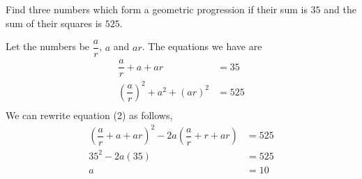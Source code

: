 
%
%
%
%
% 
% 

\question Find three numbers which form a geometric progression if their sum is $35$ and the sum of their squares is $525$.

\insertQR{}

\ifprintanswers
\fi 

\begin{solution}
  Let the numbers be $\dfrac{a}{r}$, $a$ and $ar$. The equations we have are
  \begin{align}
    \dfrac{a}{r} + a + ar           &= 35 \\
    (\dfrac{a}{r})^2 + a^2 + (ar)^2 &= 525 \\
  \end{align}
  We can rewrite equation (2) as follows,
  \begin{align}
    (\dfrac{a}{r} + a + ar)^2 - 2a(\dfrac{a}{r} + r + ar) &= 525 \\
    35^2 - 2a(35)                                         &= 525 \\
    a                                                     &= 10
  \end{align}
    

\end{solution}
